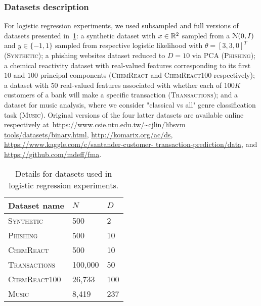 \subsubsection{Datasets description}
\label{supp:logreg_data_details}
For logistic regression experiments, we used subsampled and full versions of datasets presented in~\cref{table:datasets_details}: a synthetic dataset with $ x\in \mathbb{R}^2 $ sampled \iid from a $\mathcal{N}{(0, I)}$ and $ y\in\{-1,1\} $ sampled from respective logistic likelihood with $ \theta =[3, 3, 0]^T$ (\textsc{Synthetic}); a phishing websites dataset reduced to $ D=10 $ via PCA (\textsc{Phishing}); a chemical reactivity dataset with  real-valued features corresponding to its first $ 10 $ and $ 100 $ principal components (\textsc{ChemReact} and \textsc{ChemReact100} respectively); a dataset with $ 50 $ real-valued features associated with whether each of $ 100K $ customers of a bank will make a specific transaction (\textsc{Transactions}); and a dataset for music analysis, where we consider "classical vs all" genre classification task (\textsc{Music}). Original versions of the four latter datasets are available online respectively at~\href{https://www.csie.ntu.edu.tw/~cjlin/libsvmtools/datasets/binary.html}{https://www.csie.ntu.edu.tw/\~{}cjlin/libsvm tools/datasets/binary.html},  \href{http://komarix.org/ac/ds/}{http://komarix.org/ac/ds},  \href{https://www.kaggle.com/c/santander-customer-transaction-prediction/data}{https://www.kaggle.com/c/santander-customer- transaction-prediction/data}, and \href{https://github.com/mdeff/fma}{https://github.com/mdeff/fma}. 

\begin{table}[!h]
	\begin{center}
		\begin{tabular}{|l|l|l|}
			\hline
			\textbf{Dataset name}       & $N$      & $D$   \\ \hline
			\textsc{Synthetic}  & 500    & 2   \\ \hline
			\textsc{Phishing}   & 500    & 10  \\ \hline
			\textsc{ChemReact}        & 500    & 10  \\ \hline
			\textsc{Transactions}  & 100,000   & 50   \\ \hline
			\textsc{ChemReact100}    & 26,733 & 100 \\ \hline
			\textsc{Music}      & 8,419    & 237 \\ \hline
		\end{tabular}
	\end{center}
	\caption{Details for datasets used in logistic regression experiments.}
	\label{table:datasets_details}
\end{table}

